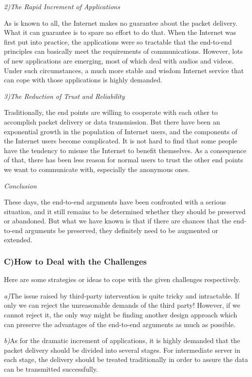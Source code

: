 \documentclass[11pt,twocolumn]{article}
\begin{document}
\emph{2)\quad The Rapid Increment of Applications}

As is known to all, the Internet makes no guarantee about the packet delivery. What it can guarantee is to spare no effort to do that. When the Internet was first put into practice, the applications were so tractable that the end-to-end principles can basically meet the requirements of communications. However, lots of new applications are emerging, most of which deal with audios and videos. Under such circumstances, a much more stable and wisdom Internet service that can cope with those applications is highly demanded. 

\emph{3)\quad The Reduction of Trust and Reliability}

Traditionally, the end points are willing to cooperate with each other to accomplish packet delivery or data transmission. But there have been an exponential growth in the population of Internet users, and the components of the Internet users become complicated. It is not hard to find that some people have the tendency to misuse the Internet to benefit themselves\cite{critical}. As a consequence of that, there has been less reason for normal users to trust the other end points we want to communicate with, especially the anonymous ones. 

\emph{Conclusion}

These days, the end-to-end arguments have been confronted with a serious situation, and it still remains to be determined whether they should be preserved or abandoned. But what we have known is that if there are chances that the end-to-end arguments be preserved, they definitely need to be augmented or extended\cite{EE2E}.

\subsubsection*{C)\quad How to Deal with the Challenges}
Here are some strategies or ideas to cope with the given challenges respectively.

\emph{a)}\quad The issue raised by third-party intervention is quite tricky and intractable. If only we can reject the unreasonable demands of the third party! However, if we cannot reject it, the only way might be finding another design approach which can preserve the advantages of the end-to-end arguments as much as possible\cite{DPFI}.

\emph{b)}\quad	As for the dramatic increment of applications, it is highly demanded that the packet delivery should be divided into several stages. For intermediate server in each stage, the delivery should be treated traditionally in order to assure the data can be transmitted successfully.
\end{document}
